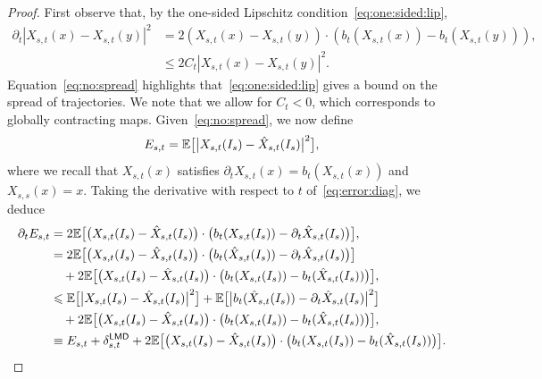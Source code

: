 \lagrangianerr*
\begin{proof}
	First observe that, by the one-sided Lipschitz condition~\eqref{eq:one:sided:lip},
	\begin{equation}
		\label{eq:no:spread}
		\begin{aligned}
			\partial_t |X_{s,t}(x) - X_{s,t}(y)|^2 & = 2 (X_{s,t}(x)-X_{s,t}(y))\cdot (b_t(X_{s,t}(x))-b_t(X_{s,t}(y))), \\
			                                       & \le 2C_t |X_{s,t}(x) - X_{s,t}(y)|^2.
		\end{aligned}
	\end{equation}
	Equation~\eqref{eq:no:spread} highlights that~\eqref{eq:one:sided:lip} gives a bound on the spread of trajectories.
	We note that we allow for $C_t<0$, which corresponds to globally contracting maps.
	Given~\eqref{eq:no:spread}, we now define
	\begin{equation}
		\label{eq:error:diag}
		E_{s,t} = \mathbb{E}\big[\big|X_{s, t}(I_s) - \hat{X}_{s, t}(I_s)\big|^2\big],
	\end{equation}
	where we recall that $X_{s,t}(x)$ satisfies $\partial_t X_{s,t}(x) = b_t(X_{s,t}(x))$ and $X_{s,s}(x) = x$.
	Taking the derivative with respect to $t$ of~\eqref{eq:error:diag}, we deduce
	\begin{equation}
		\label{eq:bound:err:1}
		\begin{aligned}
			\partial_t E_{s,t} & = 2\E\big[\big(X_{s, t}(I_s) - \hat{X}_{s, t}(I_s)\big)\cdot\big(b_t(X_{s, t}(I_s)) - \partial_t \hat{X}_{s, t}(I_s)\big)\big],                               \\
			                   & = 2 \E\big[\big(X_{s, t}(I_s) - \hat{X}_{s, t}(I_s)\big)\cdot\big(b_t(\hat X_{s, t}(I_s)) - \partial_t \hat{X}_{s, t}(I_s)\big)\big]                          \\
			                   & \quad + 2\E\big[\big(X_{s, t}(I_s) - \hat{X}_{s, t}(I_s)\big)\cdot\big(b_t(X_{s, t}(I_s))-b_t(\hat X_{s, t}(I_s)) \big)\big],                                 \\
			                   & \leq  \E\big[\big|X_{s, t}(I_s) - \hat{X}_{s, t}(I_s)\big|^2\big] +  \E\big[\big|b_t(\hat X_{s, t}(I_s)) - \partial_t \hat{X}_{s, t}(I_s)\big|^2\big]         \\
			                   & \quad +  2\E\big[\big(X_{s, t}(I_s) - \hat{X}_{s, t}(I_s)\big)\cdot\big(b_t(X_{s, t}(I_s))-b_t(\hat X_{s, t}(I_s)) \big)\big],                                \\
			                   & \equiv E_{s,t} + \delta^{\lmd}_{s,t} +  2\E\big[\big(X_{s, t}(I_s) - \hat{X}_{s, t}(I_s)\big)\cdot\big(b_t(X_{s, t}(I_s))-b_t(\hat X_{s, t}(I_s)) \big)\big].

\end{aligned}
\end{equation}
\end{proof}
